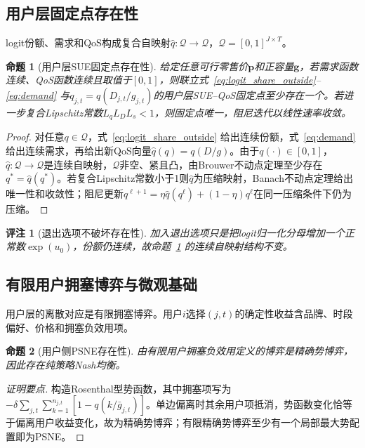 \documentclass[UTF8,11pt]{ctexart}
\newtheorem{proposition}{命题}
\newtheorem{remark}{评注}
\newcommand{\qos}{q}
\newcommand{\D}{D}
\newcommand{\p}{\boldsymbol{p}}
\newcommand{\g}{\boldsymbol{g}}
\begin{document}
\subsection{用户层固定点存在性}

logit份额、需求和QoS构成复合自映射$\widehat q:\mathcal{Q}\to\mathcal{Q}$，$\mathcal{Q}=[0,1]^{J\times T}$。

\begin{proposition}[用户层SUE固定点存在性]
\label{prop:sue_fixed_point}
给定任意可行零售价$\p$和正容量$\g$，若需求函数连续、QoS函数连续且取值于$[0,1]$，则联立式~\eqref{eq:logit_share_outside}--\eqref{eq:demand} 与$q_{j,t}=\qos(\D_{j,t}/g_{j,t})$的用户层SUE--QoS固定点至少存在一个。若进一步复合Lipschitz常数$L_\qos L_D L_s<1$，则固定点唯一，阻尼迭代以线性速率收敛。
\end{proposition}

\begin{proof}
对任意$q\in\mathcal{Q}$，式~\eqref{eq:logit_share_outside} 给出连续份额，式~\eqref{eq:demand} 给出连续需求，再给出新QoS向量$\widehat q(q)=\qos(\D/g)$。由于$\qos(\cdot)\in[0,1]$，$\widehat q:\mathcal{Q}\to\mathcal{Q}$是连续自映射，$\mathcal{Q}$非空、紧且凸，由Brouwer不动点定理至少存在$q^*=\widehat q(q^*)$。若复合Lipschitz常数小于1则$\widehat q$为压缩映射，Banach不动点定理给出唯一性和收敛性；阻尼更新$q^{\ell+1}=\eta\widehat q(q^\ell)+(1-\eta)q^\ell$在同一压缩条件下仍为压缩。
\end{proof}

\begin{remark}[退出选项不破坏存在性]
加入退出选项只是把logit归一化分母增加一个正常数$\exp(u_0)$，份额仍连续，故命题~\ref{prop:sue_fixed_point} 的连续自映射结构不变。
\end{remark}

\subsection{有限用户拥塞博弈与微观基础}

用户层的离散对应是有限拥塞博弈。用户$i$选择$(j,t)$的确定性收益含品牌、时段偏好、价格和拥塞负效用项。

\begin{proposition}[用户侧PSNE存在性]
\label{prop:psne}
由有限用户拥塞负效用定义的博弈是精确势博弈，因此存在纯策略Nash均衡。
\end{proposition}

\begin{proof}[证明要点]
构造Rosenthal型势函数，其中拥塞项写为$-\delta\sum_{j,t}\sum_{k=1}^{n_{j,t}}[1-\qos(k/\bar g_{j,t})]$。单边偏离时其余用户项抵消，势函数变化恰等于偏离用户收益变化，故为精确势博弈；有限精确势博弈至少有一个局部最大势配置即为PSNE\cite{rosenthal1973class,monderer1996potential}。
\end{proof}
\end{document}

